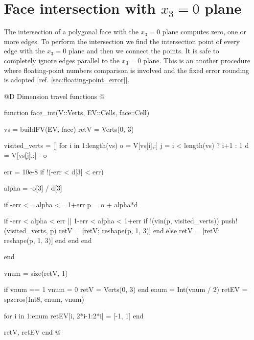 \section{Face intersection with $x_3=0$ plane}
\label{sec:face_int}

The intersection of a polygonal face with the $x_3=0$ plane computes
zero, one or more edges. To perform the intersection we find the
intersection point of every edge with the $x_3=0$ plane and then
we connect the points. It is safe to completely ignore edges
parallel to the $x_3=0$ plane.
This is an another procedure where floating-point numbers comparison is
involved and the fixed error rounding is adopted [ref. \ref{sec:floating-point_error}].

@D Dimension travel functions
@{function face_int(V::Verts, EV::Cells, face::Cell)

    vs = buildFV(EV, face)
    retV = Verts(0, 3)
    
    visited_verts = []
    for i in 1:length(vs)
        o = V[vs[i],:]
        j = i < length(vs) ? i+1 : 1
        d = V[vs[j],:] - o

        err = 10e-8
        if !(-err < d[3] < err)

            alpha = -o[3] / d[3]

            if -err <= alpha <= 1+err
                p = o + alpha*d

                if -err < alpha < err || 1-err < alpha < 1+err
                    if !(vin(p, visited_verts))
                        push!(visited_verts, p)
                        retV = [retV; reshape(p, 1, 3)] 
                    end
                else
                    retV = [retV; reshape(p, 1, 3)]
                end
            end
        end

    end

    vnum = size(retV, 1)


    if vnum == 1
        vnum = 0
        retV = Verts(0, 3)
    end
    enum = Int(vnum / 2)
    retEV = spzeros(Int8, enum, vnum)

    for i in 1:enum
        retEV[i, 2*i-1:2*i] = [-1, 1]
    end

    retV, retEV
end
@} 
